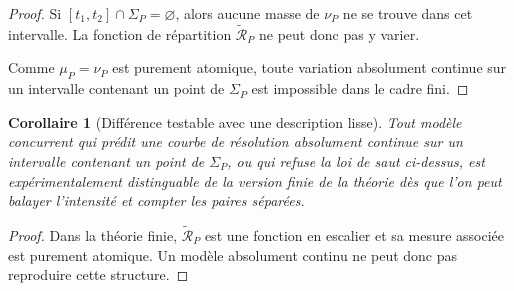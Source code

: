 \documentclass[11pt,a4paper]{article}
\newtheorem{corollary}{Corollaire}
\begin{document}
\begin{proof}
Si \([t_1,t_2]\cap\Sigma_P=\varnothing\), alors aucune masse de \(\nu_P\) ne se trouve dans cet intervalle. La fonction de répartition \(\widetilde{\mathcal R}_P\) ne peut donc pas y varier.

Comme \(\mu_P=\nu_P\) est purement atomique, toute variation absolument continue sur un intervalle contenant un point de \(\Sigma_P\) est impossible dans le cadre fini.
\end{proof}

\begin{corollary}[Différence testable avec une description lisse]
Tout modèle concurrent qui prédit une courbe de résolution absolument continue sur un intervalle contenant un point de \(\Sigma_P\), ou qui refuse la loi de saut ci-dessus, est expérimentalement distinguable de la version finie de la théorie dès que l'on peut balayer l'intensité et compter les paires séparées.
\end{corollary}

\begin{proof}
Dans la théorie finie, \(\widetilde{\mathcal R}_P\) est une fonction en escalier et sa mesure associée est purement atomique. Un modèle absolument continu ne peut donc pas reproduire cette structure.
\end{proof}
\end{document}
